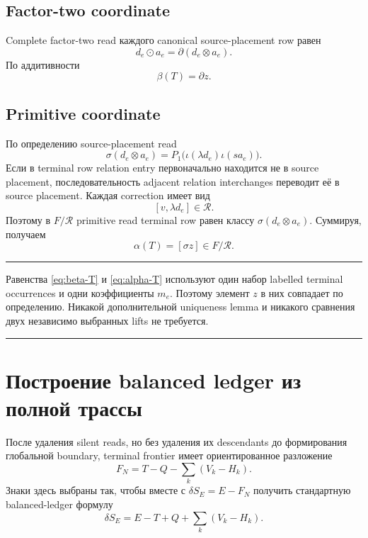 \documentclass[11pt,a4paper]{article}
\theoremstyle{definition}
\theoremstyle{remark}
\newcommand{\Rel}{\mathcal R}
\newenvironment{successbox}{%
  \par\medskip\noindent
  \begin{center}\begin{minipage}{0.94\textwidth}
  \color{darkgreen}\hrule\vspace{0.55em}
}{%
  \vspace{0.35em}\hrule\end{minipage}\end{center}\medskip
}
\begin{document}
\subsection{Factor-two coordinate}

Complete factor-two read каждого canonical source-placement row равен
\[
 d_e\odot a_e=\partial(d_e\otimes a_e).
\]
По аддитивности
\begin{equation}\label{eq:beta-T}
 \beta(T)=\partial z.
\end{equation}

\subsection{Primitive coordinate}

По определению source-placement read
\[
 \sigma(d_e\otimes a_e)
 =P_1\bigl(\iota(\lambda d_e)\iota(sa_e)\bigr).
\]
Если в terminal row relation entry первоначально находится не в source
placement, последовательность adjacent relation interchanges переводит её в
source placement. Каждая correction имеет вид
\[
 [v,\lambda d_e]\in\Rel.
\]
Поэтому в $F/\Rel$ primitive read terminal row равен классу
$\sigma(d_e\otimes a_e)$. Суммируя, получаем
\begin{equation}\label{eq:alpha-T}
 \alpha(T)=[\sigma z]\in F/\Rel.
\end{equation}

\begin{successbox}
Равенства \eqref{eq:beta-T} и \eqref{eq:alpha-T} используют один набор
labelled terminal occurrences и одни коэффициенты $m_e$. Поэтому элемент
$z$ в них совпадает по определению. Никакой дополнительной uniqueness lemma
и никакого сравнения двух независимо выбранных lifts не требуется.
\end{successbox}

\section{Построение balanced ledger из полной трассы}

После удаления silent reads, но без удаления их descendants до формирования
глобальной boundary, terminal frontier имеет ориентированное разложение
\begin{equation}\label{eq:frontier-decomp}
 F_N=T-Q-\sum_k(V_k-H_k).
\end{equation}
Знаки здесь выбраны так, чтобы вместе с
$\delta S_E=E-F_N$ получить стандартную balanced-ledger формулу
\begin{equation}\label{eq:balanced-ledger-doc}
 \delta S_E
 =E-T+Q+\sum_k(V_k-H_k).
\end{equation}
\end{document}
